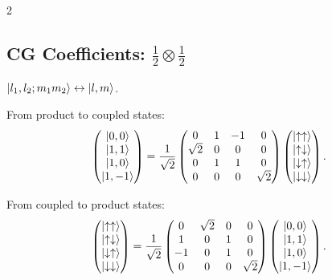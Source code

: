 \documentclass[9pt,a4paper]{article} %
\begin{document}
\begin{multicols}{2}
\subsection{CG Coefficients: $\tfrac{1}{2}\otimes\tfrac{1}{2}$}

$\ket{l_1, l_2; m_1 m_2} \leftrightarrow \ket{l, m}$.

From product to coupled states:
\[
\begin{pmatrix}
\ket{0,0} \\
\ket{1,1} \\
\ket{1,0} \\
\ket{1,-1}
\end{pmatrix}
=
\frac{1}{\sqrt{2}}
\begin{pmatrix}
0 & 1 & -1 & 0 \\
\sqrt{2} & 0 & 0 & 0 \\
0 & 1 & 1 & 0 \\
0 & 0 & 0 & \sqrt{2}
\end{pmatrix}
\begin{pmatrix}
\ket{\uparrow\uparrow} \\
\ket{\uparrow\downarrow} \\
\ket{\downarrow\uparrow} \\
\ket{\downarrow\downarrow}
\end{pmatrix}.
\]

From coupled to product states:
\[
\begin{pmatrix}
\ket{\uparrow\uparrow} \\
\ket{\uparrow\downarrow} \\
\ket{\downarrow\uparrow} \\
\ket{\downarrow\downarrow}
\end{pmatrix}
=
\frac{1}{\sqrt{2}}
\begin{pmatrix}
0 & \sqrt{2} & 0 & 0 \\
1 & 0 & 1 & 0 \\
-1 & 0 & 1 & 0 \\
0 & 0 & 0 & \sqrt{2}
\end{pmatrix}
\begin{pmatrix}
\ket{0,0} \\
\ket{1,1} \\
\ket{1,0} \\
\ket{1,-1}
\end{pmatrix}.
\]
\end{multicols}
\newpage

\end{document}
